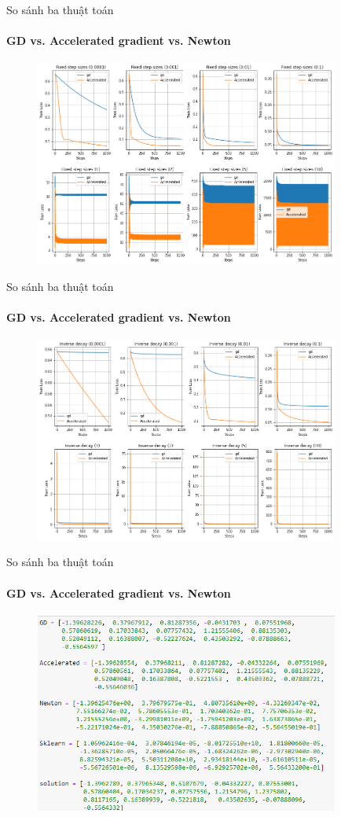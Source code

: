 \documentclass[10pt]{beamer}
\theoremstyle{remark}
\theoremstyle{definition}
\begin{document}
\begin{frame}{So sánh ba thuật toán}
	\framesubtitle{GD vs. Accelerated gradient vs. Newton}
	\begin{figure}[h!]
		\centering
		\includegraphics[width=10cm]{Thinh/26.png}
	\end{figure}
\end{frame}

\begin{frame}{So sánh ba thuật toán}
	\framesubtitle{GD vs. Accelerated gradient vs. Newton}
	\begin{figure}[h!]
		\centering
		\includegraphics[width=10cm]{Thinh/27.png}
	\end{figure}
\end{frame}

\begin{frame}{So sánh ba thuật toán}
	\framesubtitle{GD vs. Accelerated gradient vs. Newton}
	\begin{figure}[h!]
		\centering
		\includegraphics[width=10cm]{Thinh/28.png}
	\end{figure}
\end{frame}
\end{document}
